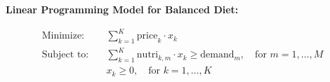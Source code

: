 \documentclass{article}
\begin{document}
\textbf{Linear Programming Model for Balanced Diet:}

\begin{align*}
\text{Minimize:} \quad & \sum_{k=1}^{K} \text{price}_k \cdot x_k \\
\text{Subject to:} \quad & \sum_{k=1}^{K} \text{nutri}_{k,m} \cdot x_k \geq \text{demand}_m, \quad \text{for } m = 1, \ldots, M \\
& x_k \geq 0, \quad \text{for } k = 1, \ldots, K
\end{align*}
\end{document}
